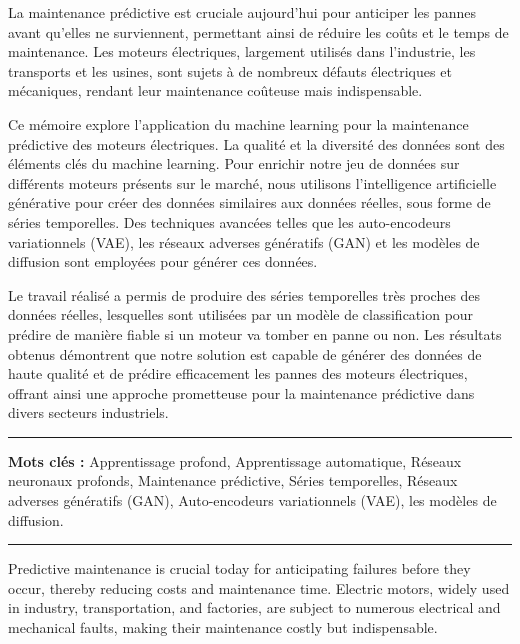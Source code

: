 
La maintenance prédictive est cruciale aujourd'hui pour anticiper les pannes
avant qu'elles ne surviennent, permettant ainsi de réduire les coûts et le
temps de maintenance. Les moteurs électriques, largement utilisés dans
l'industrie, les transports et les usines, sont sujets à de nombreux défauts
électriques et mécaniques, rendant leur maintenance coûteuse mais
indispensable.

\medskip

Ce mémoire explore l'application du machine learning pour la maintenance
prédictive des moteurs électriques. La qualité et la diversité des données sont  des éléments clés
du machine learning. Pour enrichir notre jeu de données sur différents moteurs
présents sur le marché, nous utilisons l'intelligence artificielle générative
pour créer des données similaires aux données réelles, sous forme de séries
temporelles. Des techniques avancées telles que les auto-encodeurs
variationnels (VAE), les réseaux adverses génératifs (GAN) et les
modèles de diffusion sont employées pour générer ces données.

\medskip
Le travail réalisé a permis de produire des séries temporelles très proches des données réelles,
lesquelles sont utilisées par un modèle de classification pour prédire de manière fiable si un moteur va tomber en panne ou non.
Les résultats obtenus démontrent que notre solution est capable de générer des données de haute qualité et de prédire efficacement
les pannes des moteurs électriques, offrant ainsi une approche prometteuse pour la maintenance prédictive dans divers secteurs industriels.

\vspace{1cm}

\noindent\rule[2pt]{\textwidth}{0.5pt}

{\textbf{Mots clés :}}
Apprentissage profond, Apprentissage automatique, Réseaux neuronaux profonds, Maintenance prédictive,
Séries temporelles, Réseaux adverses génératifs (GAN), Auto-encodeurs variationnels (VAE), les
modèles de diffusion.
\\
\noindent\rule[2pt]{\textwidth}{0.5pt}

\clearpage


Predictive maintenance is crucial today for anticipating failures before they
occur, thereby reducing costs and maintenance time. Electric motors, widely
used in industry, transportation, and factories, are subject to numerous
electrical and mechanical faults, making their maintenance costly but
indispensable.

